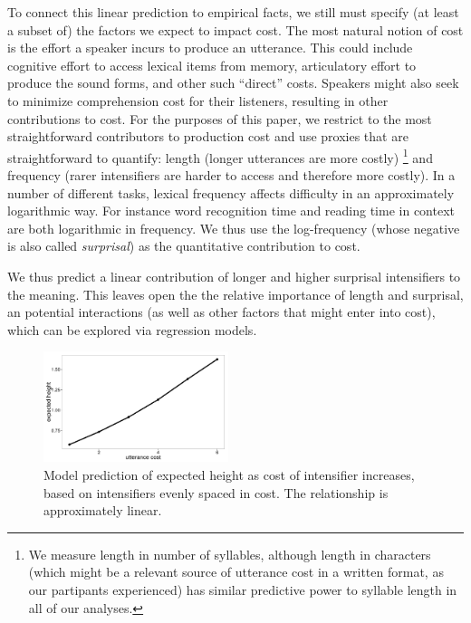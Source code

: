 \documentclass[10pt,letterpaper]{article}
\begin{document}
To connect this linear prediction to empirical facts, we still must specify (at least a subset of) the factors we expect to impact cost.
%
The most natural notion of cost is the effort a speaker incurs to produce an utterance. This could include cognitive effort to access lexical items from memory, articulatory effort to produce the sound forms, and other such ``direct'' costs. Speakers might also seek to minimize comprehension cost for their listeners, resulting in other contributions to cost. 
For the purposes of this paper, we restrict to the most straightforward contributors to production cost and use proxies that are straightforward to quantify: length (longer utterances are more costly)
\footnote{We measure length in number of syllables, although length in characters (which might be a relevant source of utterance cost in a written format, as our partipants experienced) has similar predictive power to syllable length in all of our analyses.}
and frequency (rarer intensifiers are harder to access and therefore more costly).
In a number of different tasks, lexical frequency affects difficulty in an approximately logarithmic way. For instance word recognition time \cite{McCusker1977} 
and reading time in context \cite{smithLevy} are both logarithmic in frequency. We thus use the log-frequency (whose negative is also called \emph{surprisal}) as the quantitative contribution to cost.

We thus predict  a linear contribution of longer and higher surprisal intensifiers to the meaning. 
This leaves open the the relative importance of length and surprisal, an potential interactions (as well as other factors that might enter into cost), which can be explored via regression models.


\begin{figure}[ht]
\begin{center}
\includegraphics[width=0.48\textwidth]{analysis_files_for_writeup/images/height-by-cost.png}
\end{center}
\caption{Model prediction of expected height as cost of intensifier increases, based on intensifiers evenly spaced in cost. The relationship is approximately linear.} 
\label{model-heights}
\end{figure}
\end{document}
